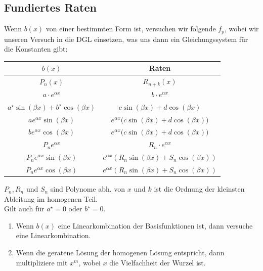 \documentclass[a4paper,10pt]{article}
\begin{document}
\subsection{Fundiertes Raten}

Wenn $b(x)$ von einer bestimmten Form ist, versuchen wir folgende $f_p$, wobei wir unseren Versuch in die DGL einsetzen, was uns dann ein Gleichungssystem für die Konstanten gibt:




\begin{center}
	\renewcommand*{\arraystretch}{1.6}
	\begin{tabular}{cc} 
		\toprule
		$b(x)$                                & Raten                                                               \\ 
		\midrule     
		$P_n(x)$                              & $R_{n+k}(x)$                                                        \\
		$a \cdot e^{\alpha x}$                & $b \cdot e^{\alpha x}$                                              \\
		$a^\star \sin(\beta x)+b^\star \cos(\beta x)$ & $c \sin(\beta x) + d \cos(\beta x)$                                 \\
		$a e^{\alpha x} \sin(\beta x)$        & $e^{\alpha x} \Big( c \sin(\beta x) + d \cos(\beta x) \Big)$        \\
		$b e^{\alpha x} \cos(\beta x)$        & $e^{\alpha x} \Big( c \sin(\beta x) + d \cos(\beta x) \Big)$        \\
		$P_n e^{\alpha x}$                    & $R_n \cdot e^{\alpha x}$                                            \\
		$P_n e^{\alpha x} \sin(\beta x)$      & $e^{\alpha x} \left( R_n \sin(\beta x) + S_n \cos(\beta x) \right)$ \\
		$P_n e^{\alpha x} \cos(\beta x)$      & $e^{\alpha x} \left( R_n \sin(\beta x) + S_n \cos(\beta x) \right)$ \\
		\bottomrule
	\end{tabular}
\end{center}

\noindent $P_n, R_n $ und $S_n$ sind Polynome abh. von $x$ und $k$ ist die Ordnung der kleinsten Ableitung im homogenen Teil. \\
Gilt auch für $a^\star=0$ oder $b^\star=0$.

\begin{enumerate}
	\item Wenn $b(x)$ eine Linearkombination der Basisfunktionen ist, dann versuche eine Linearkombination.
	\item Wenn die geratene Lösung der homogenen Lösung entspricht, dann multipliziere mit $x^m$, wobei $x$ die Vielfachheit der Wurzel ist.
\end{enumerate}
\end{document}
